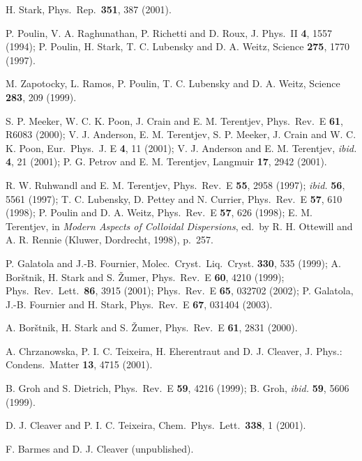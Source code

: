 \documentclass[aps,pre,twocolumn,groupedaddress,showpacs]{revtex4}
\begin{document}
\begin{thebibliography}{99}


 H. Stark, Phys.\ Rep.\ {\bf 351}, 387 (2001).

 P. Poulin, V. A. Raghunathan, P. Richetti and D. Roux, 
J. Phys.\ II {\bf 4}, 1557 (1994); P. Poulin, H. Stark, T. C. Lubensky and 
D. A. Weitz, Science {\bf 275}, 1770 (1997).

 M. Zapotocky, L. Ramos, P. Poulin, T. C. Lubensky
and D. A. Weitz, Science {\bf 283}, 209 (1999).

 S. P. Meeker, W. C. K. Poon, J. Crain and E. M. Terentjev, 
Phys.\ Rev.\ E {\bf 61}, R6083 (2000); 
V. J. Anderson, E. M. Terentjev, S. P. Meeker, J. Crain and
W. C. K. Poon, Eur.\ Phys.\ J. E {\bf 4}, 11 (2001); V. J. Anderson and 
E. M. Terentjev, {\it ibid.} {\bf 4}, 21 (2001); P. G. Petrov and E. M. 
Terentjev, Langmuir {\bf 17}, 2942 (2001).

 R. W. Ruhwandl and E. M. Terentjev, Phys.\ Rev.\ E
{\bf 55}, 2958 (1997); {\it ibid.} {\bf 56}, 5561 (1997); 
T. C. Lubensky, D. Pettey and N. Currier, Phys.\ Rev.\ E {\bf 57}, 610 (1998);
P. Poulin and D. A. Weitz, Phys.\ Rev.\ E {\bf 57}, 626 (1998);
E. M. Terentjev, in {\it Modern Aspects of Colloidal Dispersions}, ed.\ by
R. H. Ottewill and A. R. Rennie (Kluwer, Dordrecht, 1998), p.\ 257.

 P. Galatola and J.-B. Fournier, Molec.\ Cryst.\ Liq.\
Cryst. {\bf 330}, 535 (1999); A. Bor\v{s}tnik, H. Stark and S. \v{Z}umer,
Phys.\ Rev.\ E {\bf 60}, 4210 (1999);
Phys.\ Rev.\ Lett.\ {\bf 86}, 3915 (2001);
Phys.\ Rev.\ E {\bf 65}, 032702 (2002); P. Galatola, J.-B. Fournier and
H. Stark, Phys.\ Rev.\ E {\bf 67}, 031404 (2003).

 A. Bor\v{s}tnik, H. Stark and S. \v{Z}umer,
Phys.\ Rev.\ E {\bf 61}, 2831 (2000).

 A. Chrzanowska, P. I. C. Teixeira, H. Eherentraut
and D. J. Cleaver, J. Phys.: Condens.\ Matter {\bf 13}, 4715 (2001).

 B. Groh and S. Dietrich, Phys.\ Rev.\ E {\bf 59}, 4216 (1999);
B. Groh, {\it ibid.} {\bf 59}, 5606 (1999).

 D. J. Cleaver and P. I. C. Teixeira, Chem.\ Phys.\
Lett.\ {\bf 338}, 1 (2001).

 F. Barmes and D. J. Cleaver (unpublished).


\end{thebibliography}
\end{document}
